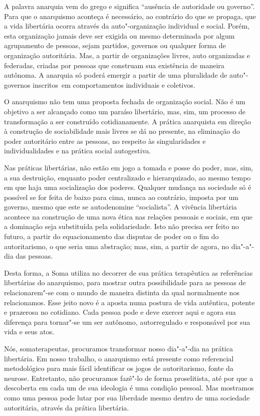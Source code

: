 A palavra anarquia vem do grego e significa ``ausência de autoridade ou
governo''. Para que o anarquismo aconteça é necessário, ao contrário do
que se propaga, que a vida libertária ocorra através da auto"-organização
individual e social. Porém, esta organização jamais deve ser exigida ou
mesmo determinada por algum agrupamento de pessoas, sejam partidos,
governos ou qualquer forma de organização autoritária. Mas, a partir de
organizações livres, auto organizadas e federadas, criadas por pessoas
que construam sua existência de maneira autônoma. A anarquia só poderá
emergir a partir de uma pluralidade de auto"-governos inscritos~em
comportamentos individuais e coletivos.

O anarquismo não tem uma proposta fechada de organização social. Não é
um objetivo a ser alcançado como um paraíso libertário, mas, sim, um
processo de transformação a ser construído cotidianamente. A prática
anarquista em direção à construção de sociabilidade mais livres se dá no
presente, na eliminação do poder autoritário entre as pessoas, no
respeito às singularidades e individualidades e na prática social
autogestiva.

Nas práticas libertárias, não estão em jogo a tomada e posse do poder,
mas, sim, a sua destruição, enquanto poder centralizado e hierarquizado,
ao mesmo tempo em que haja uma socialização dos poderes. Qualquer
mudança na sociedade só é possível se for feita de baixo para cima,
nunca ao contrário, imposta por um governo, mesmo que este se
autodenomine ``socialista''. A vivência libertária acontece na
construção de uma nova ética nas relações pessoais e sociais, em que a
dominação seja substituída pela solidariedade. Isto não precisa ser
feito no futuro, a partir do equacionamento das disputas de poder ou o
fim do autoritarismo, o que seria uma abstração; mas, sim, a partir de
agora, no dia"-a"-dia das pessoas.

Desta forma, a Soma utiliza no decorrer de sua prática terapêutica as
referências libertárias do anarquismo, para mostrar outra possibilidade
para as pessoas de relacionarem"-se com o mundo de maneira distinta da
qual normalmente nos relacionamos. Esse jeito novo é a aposta numa
postura de vida autêntica, potente e prazerosa no cotidiano. Cada pessoa
pode e deve exercer aqui e agora sua diferença para tornar"-se um ser
autônomo, autorregulado e responsável por sua vida e seus atos.

Nós, somaterapeutas, procuramos transformar nosso dia"-a"-dia na prática
libertária. Em nosso trabalho, o anarquismo está presente como
referencial metodológico para mais fácil identificar os jogos de
autoritarismo, fonte da neurose. Entretanto, não procuramos fazê"-lo de
forma proselitista, até por que a descoberta em cada um de sua ideologia
é uma condição pessoal. Mas mostramos como uma pessoa pode lutar por sua
liberdade mesmo dentro de uma sociedade autoritária, através da prática
libertária.

